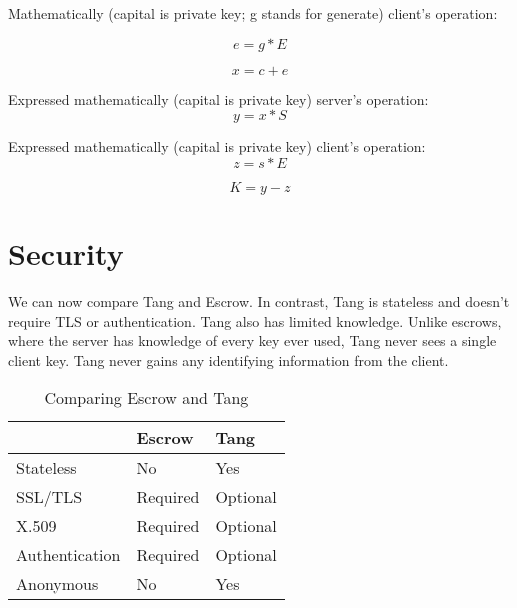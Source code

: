 \documentclass[../xdudla00-porting-Tang-to-Open-WRT.tex]{subfiles}
\begin{document}
Mathematically (capital is private key; g stands for generate) client's operation:

\begin{equation}
    e = g * E
\end{equation}

\begin{equation}
    x = c + e
\end{equation}

Expressed mathematically (capital is private key) server's operation:
\begin{equation}
    y = x * S
\end{equation}

Expressed mathematically (capital is private key) client's operation:
\begin{equation}
    z = s * E
\end{equation}

\begin{equation}
    K = y - z
\end{equation}

\section{Security}

We can now compare Tang and Escrow. In contrast, Tang is stateless and doesn't require TLS \cite{tls} or authentication.
Tang also has limited knowledge. Unlike escrows, where the server has knowledge of every key ever used, Tang never sees a single client key.
Tang never gains any identifying information from the client.

\begin{table}[h]
\centering
\label{compare}
\begin{tabular}{@{}lll@{}}
\toprule
               & Escrow   & Tang                         \\ \midrule
Stateless      & No       & Yes                          \\
SSL/TLS        & Required & Optional                     \\
X.509          & Required & Optional                     \\
Authentication & Required & Optional                     \\
Anonymous      & No       & Yes                          \\ \bottomrule
\end{tabular}
\caption{Comparing Escrow and Tang}
\end{table}
\end{document}

